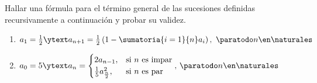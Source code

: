 \begin{enunciado}{\ejercicio}
  Hallar una fórmula para el término general de las sucesiones definidas recursivamente a continuación
  y probar su validez.
  \begin{enumerate}[label=\roman*)]
    \item $a_1 =   \frac{1}{2} \ytext a_{n+1} = \frac{1}{2}\left(1 - \sumatoria{i=1}{n} a_i\right),\
            \paratodo n \en \naturales $
    \item $a_0 = 5 \ytext
            a_n =
            \begin{cases}
              2a_{n-1},                     & \text{si $n$ es impar} \\
              \frac{1}{5}a^2_{\frac{n}{2}}, & \text{si $n$ es par}
            \end{cases}
            ,\, \paratodo n \en \naturales $
  \end{enumerate}
\end{enunciado}

